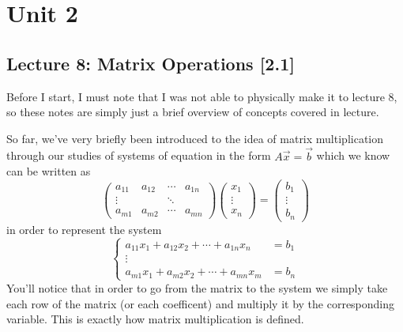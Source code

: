 \section{Unit 2}
\subsection{Lecture 8: Matrix Operations [2.1]}

\begin{impbox}{}{}
    Before I start, I must note that I was not able to physically make it to lecture 8, so these notes are simply just a brief overview of concepts covered in lecture.
\end{impbox}

So far, we've very briefly been introduced to the idea of matrix multiplication through our studies of systems of equation in the form $A\vec{x}=\vec{b}$ which we know can be written as
\[
    \begin{pmatrix}
        a_{11} & a_{12} & \cdots & a_{1n} \\
        \vdots & & \ddots \\
        a_{m1} & a_{m2} & \cdots & a_{mn}
    \end{pmatrix}
    \begin{pmatrix} x_1 \\ \vdots \\ x_n \end{pmatrix} 
    = 
    \begin{pmatrix}
        b_1 \\ \vdots \\ b_n
    \end{pmatrix}    
\]
in order to represent the system 
\[
    \begin{cases}
        a_{11}x_1 + a_{12}x_2 + \cdots + a_{1n}x_n &= b_1 \\
        \vdots \\
        a_{m1}x_1 + a_{m2}x_2 + \cdots + a_{mn}x_m &= b_n
    \end{cases}
\]
You'll notice that in order to go from the matrix to the system we simply take each row of the matrix (or each coefficent) and multiply it by the corresponding variable. This is exactly how matrix multiplication is defined.

